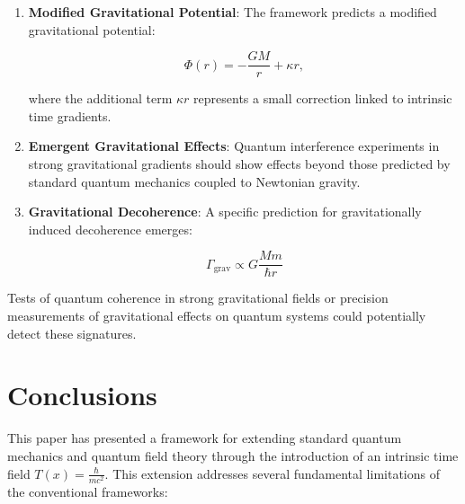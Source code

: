 \documentclass[12pt,a4paper]{article}
\newcommand{\Tfield}{T(x)}
\begin{document}
	\begin{enumerate}
		\item \textbf{Modified Gravitational Potential}: The framework predicts a modified gravitational potential:
		
		\begin{equation}
			\Phi(r) = -\frac{G M}{r} + \kappa r,
			\label{eq:modified_potential}
		\end{equation}
		
		where the additional term $\kappa r$ represents a small correction linked to intrinsic time gradients.
		
		\item \textbf{Emergent Gravitational Effects}: Quantum interference experiments in strong gravitational gradients should show effects beyond those predicted by standard quantum mechanics coupled to Newtonian gravity.
		
		\item \textbf{Gravitational Decoherence}: A specific prediction for gravitationally induced decoherence emerges:
		
		\begin{equation}
			\Gamma_{\text{grav}} \propto G \frac{M m}{\hbar r}
			\label{eq:grav_decoherence}
		\end{equation}
	\end{enumerate}
	
	Tests of quantum coherence in strong gravitational fields or precision measurements of gravitational effects on quantum systems could potentially detect these signatures.
	
	\section{Conclusions}
	\label{sec:conclusions}
	
	This paper has presented a framework for extending standard quantum mechanics and quantum field theory through the introduction of an intrinsic time field $\Tfield = \frac{\hbar}{mc^2}$. This extension addresses several fundamental limitations of the conventional frameworks:
	
\end{document}

